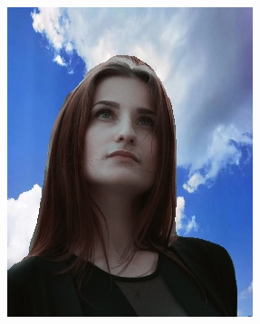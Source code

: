 \documentclass[11pt]{article}
\begin{document}
\begin{figure}[!h]
{\begin{minipage}[t]{0.2\linewidth}
  \includegraphics[width=1\linewidth]{d3.jpg}
  \end{minipage}%
  }%



\end{figure}
\end{document}
